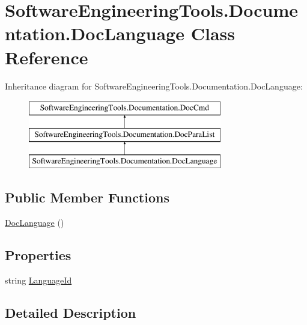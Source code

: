 \hypertarget{class_software_engineering_tools_1_1_documentation_1_1_doc_language}{\section{Software\+Engineering\+Tools.\+Documentation.\+Doc\+Language Class Reference}
\label{class_software_engineering_tools_1_1_documentation_1_1_doc_language}
}
Inheritance diagram for Software\+Engineering\+Tools.\+Documentation.\+Doc\+Language\+:\begin{figure}[H]
\begin{center}
\leavevmode
\includegraphics[height=3.000000cm]{class_software_engineering_tools_1_1_documentation_1_1_doc_language}
\end{center}
\end{figure}
\subsection*{Public Member Functions}
\begin{DoxyCompactItemize}
\item 
\hyperlink{class_software_engineering_tools_1_1_documentation_1_1_doc_language_a1eac6da5efa1b1b3713a527267cb1941}{Doc\+Language} ()
\end{DoxyCompactItemize}
\subsection*{Properties}
\begin{DoxyCompactItemize}
\item 
string \hyperlink{class_software_engineering_tools_1_1_documentation_1_1_doc_language_a2f72ea1497ef3060ceab4eb7f1b419fc}{Language\+Id}
\end{DoxyCompactItemize}


\subsection{Detailed Description}


